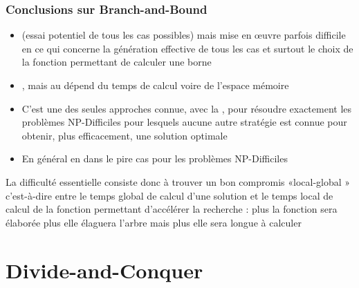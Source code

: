 \documentclass[aspectratio=1610,francais,envcountsect]{beamer}
\begin{document}
\begin{frame}
  \frametitle{Conclusions sur Branch-and-Bound}

  \begin{itemize}
  \item {} (essai potentiel de tous
    les cas possibles) mais mise en œuvre parfois difficile en ce qui
    concerne la génération effective de tous les cas et surtout le
    choix de la fonction permettant de calculer une borne
  \item {}, mais au
    dépend du temps de calcul voire de l'espace mémoire
  \item C'est une des seules approches connue, avec la
    , pour résoudre exactement les
    problèmes NP-Difficiles pour lesquels aucune autre stratégie est
    connue pour obtenir, plus efficacement, une solution optimale
  \item En général en  dans le pire cas
    pour les problèmes NP-Difficiles
  \end{itemize}

  La difficulté essentielle consiste donc à trouver un bon compromis
  «local-global » c'est-à-dire entre le temps global de calcul d'une
  solution et le temps local de calcul de la fonction permettant
  d'accélérer la recherche : plus la fonction sera élaborée plus elle
  élaguera l'arbre mais plus elle sera longue à calculer
\end{frame}

\section{Divide-and-Conquer}
\end{document}
